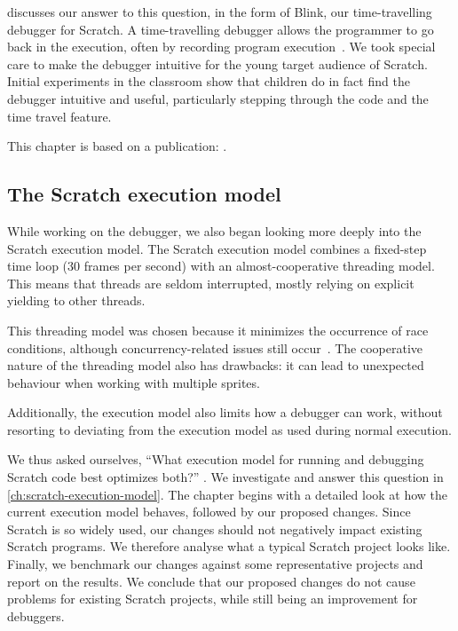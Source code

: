 \documentclass[../main]{subfiles}
\begin{document}
 discusses our answer to this question, in the form of Blink, our time-travelling debugger for Scratch.
A time-travelling debugger allows the programmer to go back in the execution, often by recording program execution~\autocite{barrTardisAffordableTimetravel2014,barrTimetravelDebuggingJavaScript2016,czaplickiAsynchronousFunctionalReactive2013,balzerEXDAMSExtendableDebugging1969,ungarDebuggingExperienceImmediacy1997,chenReversibleDebuggingUsing2001,crescenziReversibleExecutionVisualization2000}.
We took special care to make the debugger intuitive for the young target audience of Scratch.
Initial experiments in the classroom show that children do in fact find the debugger intuitive and useful, particularly stepping through the code and the time travel feature.

This chapter is based on a publication: \textcite{strijbolBlinkEducationalSoftware2024}.

\subsection{The Scratch execution model}\label{subsec:the-scratch-execution-model}

While working on the debugger, we also began looking more deeply into the Scratch execution model.
The Scratch execution model combines a fixed-step time loop (30 frames per second) with an almost-cooperative threading model.
This means that threads are seldom interrupted, mostly relying on explicit yielding to other threads.

This threading model was chosen because it minimizes the occurrence of race conditions, although concurrency-related issues still occur~\autocite{maloneyScratchProgrammingLanguage2010}.
The cooperative nature of the threading model also has drawbacks: it can lead to unexpected behaviour when working with multiple sprites.

Additionally, the execution model also limits how a debugger can work, without resorting to deviating from the execution model as used during normal execution.

We thus asked ourselves, ``What execution model for running and debugging Scratch code best optimizes both?'' .
We investigate and answer this question in \cref{ch:scratch-execution-model}.
The chapter begins with a detailed look at how the current execution model behaves, followed by our proposed changes.
Since Scratch is so widely used, our changes should not negatively impact existing Scratch programs.
We therefore analyse what a typical Scratch project looks like.
Finally, we benchmark our changes against some representative projects and report on the results.
We conclude that our proposed changes do not cause problems for existing Scratch projects, while still being an improvement for debuggers.
\end{document}
